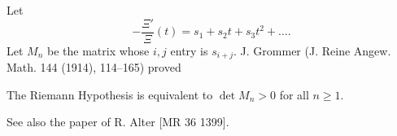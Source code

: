 \documentclass[12pt,letterpaper, reqno]{aimpl}
\begin{document}
\begin{problemblock}
Let
$$-\frac{\Xi'}{\Xi}(t)=s_1+s_2t+s_3t^2+\dots.$$
Let $M_n$ be the matrix whose $i,j$ entry is $s_{i+j}$.
J. Grommer (J. Reine Angew. Math.  144 (1914), 114--165) proved

\begin{rhequivalence}[9.3] The Riemann Hypothesis is equivalent to
$\det M_n>0 $ for all $n\ge 1$.
\end{rhequivalence}


\begin{remark}
See also the paper of R. Alter [MR 36 1399].
\end{remark}
\end{problemblock}
\end{document}
